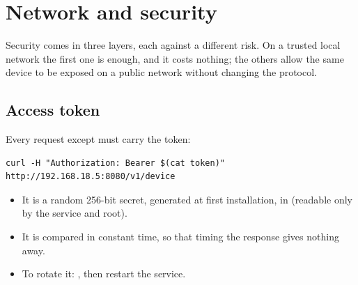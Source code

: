 \chapter{Network and security}\label{cap:security}

Security comes in three layers, each against a different risk. On a trusted
local network the first one is enough, and it costs nothing; the others allow
the same device to be exposed on a public network without changing the
protocol.

\begin{center}
\end{center}

\section{Access token}

Every request except  must carry the token:

\begin{lstlisting}[language=shell]
curl -H "Authorization: Bearer $(cat token)" http://192.168.18.5:8080/v1/device
\end{lstlisting}

\begin{itemize}
  \item It is a random 256-bit secret, generated at first installation, in
     (readable only by the service and root).
  \item It is compared in constant time, so that timing the response gives
    nothing away.
  \item To rotate it:
    , then restart
    the service.
\end{itemize}

